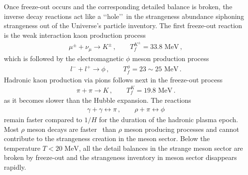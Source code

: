 \documentclass[universe,article,submit,moreauthors,pdftex,a4paper]{Definitions/mdpi}
\newcommand{\MeV}{\text{ MeV}}
\begin{document}
Once freeze-out occurs and the corresponding detailed balance is broken, the inverse decay reactions act like a \lq\lq hole\rq\rq\ in the strangeness abundance siphoning strangeness out of the Universe's particle inventory. The first freeze-out reaction is the weak interaction kaon production process
\begin{align}
    \mu^\pm+\nu_{\mu}\rightarrow K^\pm\,,\qquad T_f^{K^\pm}=33.8\MeV\,,
\end{align}
which is followed by the electromagnetic $\phi$ meson production process
\begin{align}
    l^-+l^+\rightarrow\phi\,,\qquad T_f^\phi=23\sim25\MeV\,.
\end{align}
Hadronic kaon production via pions follows next in the freeze-out process
\begin{align}
    \pi+\pi\rightarrow K\,,\qquad T_f^K=19.8\MeV\,.
\end{align}
as it becomes slower than the Hubble expansion. The reactions
\begin{align}
    \gamma+\gamma\leftrightarrow\pi\,,\qquad\rho+\pi\leftrightarrow\phi
\end{align}
remain faster compared to $1/H$ for the duration of the hadronic plasma epoch. Most $\rho$ meson decays are faster~\cite{ParticleDataGroup:2018ovx} than $\rho$ meson producing processes and cannot contribute to the strangeness creation in the meson sector. Below the temperature $T<20\MeV$, all the detail balances in the strange meson sector are broken by freeze-out and the strangeness inventory in meson sector disappears rapidly.
\end{document}
